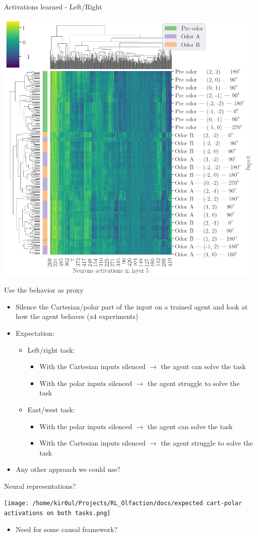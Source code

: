 \documentclass[bigger]{beamer}
\begin{document}
\begin{frame}[label={sec:org0498e6c}]{Activations learned - Left/Right}
\begin{center}
\includegraphics[height=0.9\textheight]{img/activations-learned-LeftRight.png}
\end{center}
\end{frame}
\begin{frame}[<+->][label={sec:orgbb633f5}]{Use the behavior as proxy}
\begin{itemize}
\item Silence the Cartesian/polar part of the input on a trained agent and look at how the agent behaves (x4 experiments)
\item Expectation:
\begin{itemize}
\item Left/right task:
\begin{itemize}
\item With the \alert{Cartesian} inputs silenced \(\to\) the agent can solve the task
\item With the \alert{polar} inputs silenced \(\to\) the agent struggle to solve the task
\end{itemize}
\item East/west task:
\begin{itemize}
\item With the \alert{polar} inputs silenced \(\to\) the agent can solve the task
\item With the \alert{Cartesian} inputs silenced \(\to\) the agent struggle to solve the task
\end{itemize}
\end{itemize}
\item Any other approach we could use?
\end{itemize}
\end{frame}
\begin{frame}[label={sec:org2d83024}]{Neural representations?}
\begin{center}
\texttt{[image: /home/kir0ul/Projects/RL\_Olfaction/docs/expected cart-polar activations on both tasks.png]}
\end{center}
\begin{itemize}
\item Need for some causal framework?
\end{itemize}
\end{frame}
\end{document}
